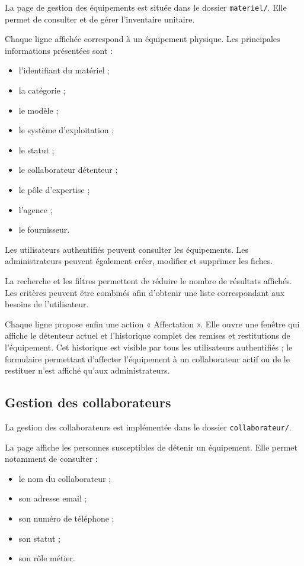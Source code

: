 \documentclass{rapportENSIAS}
\begin{document}
La page de gestion des équipements est située dans le dossier \texttt{materiel/}. Elle permet de consulter et de gérer l’inventaire unitaire.

Chaque ligne affichée correspond à un équipement physique. Les principales informations présentées sont :

\begin{itemize}
    \item l’identifiant du matériel ;
    \item la catégorie ;
    \item le modèle ;
    \item le système d’exploitation ;
    \item le statut ;
    \item le collaborateur détenteur ;
    \item le pôle d’expertise ;
    \item l’agence ;
    \item le fournisseur.
\end{itemize}

Les utilisateurs authentifiés peuvent consulter les équipements. Les administrateurs peuvent également créer, modifier et supprimer les fiches.

La recherche et les filtres permettent de réduire le nombre de résultats affichés. Les critères peuvent être combinés afin d’obtenir une liste correspondant aux besoins de l’utilisateur.

Chaque ligne propose enfin une action « Affectation ». Elle ouvre une fenêtre qui affiche le détenteur actuel et l’historique complet des remises et restitutions de l’équipement. Cet historique est visible par tous les utilisateurs authentifiés ; le formulaire permettant d’affecter l’équipement à un collaborateur actif ou de le restituer n’est affiché qu’aux administrateurs.

\subsection{Gestion des collaborateurs}

La gestion des collaborateurs est implémentée dans le dossier \texttt{collaborateur/}.

La page affiche les personnes susceptibles de détenir un équipement. Elle permet notamment de consulter :

\begin{itemize}
    \item le nom du collaborateur ;
    \item son adresse email ;
    \item son numéro de téléphone ;
    \item son statut ;
    \item son rôle métier.
\end{itemize}
\end{document}
